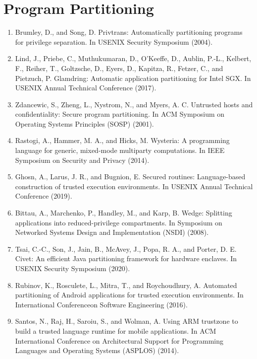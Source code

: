 \section{Program Partitioning} 

\begin{enumerate}[resume]
\item  Brumley, D., and Song, D. Privtrans: Automatically partitioning programs for privilege separation. In USENIX Security Symposium (2004).
\item  Lind, J., Priebe, C., Muthukumaran, D., O’Keeffe, D., Aublin, P.-L., Kelbert, F., Reiher, T., Goltzsche, D., Eyers, D., Kapitza, R., Fetzer, C., and Pietzuch, P. Glamdring: Automatic application partitioning for Intel SGX. In USENIX Annual Technical Conference (2017).
\item  Zdancewic, S., Zheng, L., Nystrom, N., and Myers, A. C. Untrusted hosts and confidentiality: Secure program partitioning. In ACM Symposium on Operating Systems Principles (SOSP) (2001).
\item  Rastogi, A., Hammer, M. A., and Hicks, M. Wysteria: A programming language for generic, mixed-mode multiparty computations. In IEEE Symposium on Security and Privacy (2014).
\item Ghosn, A., Larus, J. R., and Bugnion, E. Secured routines: Language-based construction of trusted execution environments. In USENIX Annual Technical Conference (2019).
\item Bittau, A., Marchenko, P., Handley, M., and Karp, B. Wedge: Splitting applications into reduced-privilege compartments. In Symposium on Networked Systems Design and Implementation (NSDI) (2008).
\item Tsai, C.-C., Son, J., Jain, B., McAvey, J., Popa, R. A., and Porter, D. E. Civet: An efficient Java partitioning framework for hardware enclaves. In USENIX Security Symposium (2020).
\item Rubinov, K., Rosculete, L., Mitra, T., and Roychoudhury, A. Automated partitioning of Android applications for trusted execution environments. In International Conferenceon Software Engineering (2016).
\item Santos, N., Raj, H., Saroiu, S., and Wolman, A. Using ARM trustzone to build a trusted language runtime for mobile applications. In ACM International Conference on Architectural Support for Programming Languages and Operating Systems (ASPLOS) (2014).
\end{enumerate}

